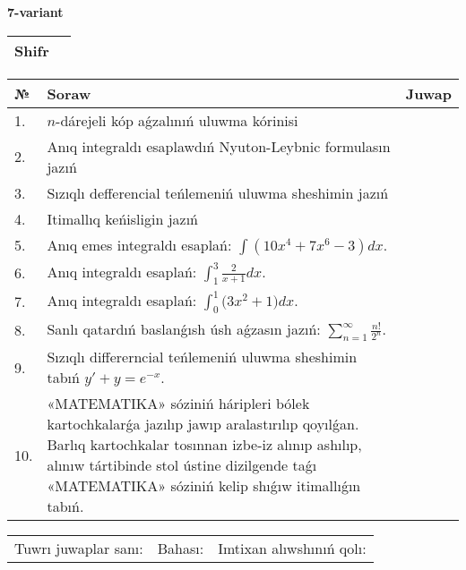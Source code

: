 \documentclass{article}
\begin{document}
  \egroup
  
  \newpage
  
  
  \textbf{7-variant}\\
  
  \bgroup
  \def\arraystretch{1.6} %
  
  \begin{tabular}{|m{5.7cm}|m{9.5cm}|}
  \hline
  Shifr & \\
  \hline
  \end{tabular}
  
  \vspace{1cm}
  
  \begin{tabular}{|m{0.7cm}|m{10cm}|m{4cm}|}
  \hline
  № & Soraw & Juwap \\
  \hline
  1. & \(n\)-dárejeli kóp aǵzalınıń uluwma kórinisi &  \\
  \hline
  2. & Anıq integraldı esaplawdıń Nyuton-Leybnic formulasın jazıń &  \\
  \hline
  3. & Sızıqlı defferencial teńlemeniń uluwma sheshimin jazıń &  \\
  \hline
  4. & Itimallıq keńisligin jazıń &  \\
  \hline
  5. & Anıq emes integraldı esaplań: \(\int{\left( 10x^{4} + 7x^{6} - 3 \right)dx}\). &  \\
  \hline
  6. & Anıq integraldı esaplań: \(\int_{1}^{3}\frac{2}{x + 1}dx\). &  \\
  \hline
  7. & Anıq integraldı esaplań: \(\int_{0}^{1}{(3x^2 } + 1)dx\). &  \\
  \hline
  8. & Sanlı qatardıń baslanǵısh úsh aǵzasın jazıń: \(\sum_{n = 1}^{\infty}\frac{n!}{2^{n}}\). &  \\
  \hline
  9. & Sızıqlı differerncial teńlemeniń uluwma sheshimin tabıń \(y' + y = e^{- x}\). &  \\
  \hline
  10. & «MATEMATIKA» sóziniń háripleri bólek kartochkalarǵa jazılıp jawıp aralastırılıp qoyılǵan. Barlıq kartochkalar tosınnan izbe-iz alınıp ashılıp, alınıw tártibinde stol ústine dizilgende taǵı «MATEMATIKA» sóziniń kelip shıǵıw itimallıǵın tabıń. &  \\
  \hline
  \end{tabular}
  
  \vspace{1cm}
  
  \begin{tabular}{lll}
  Tuwrı juwaplar sanı: \underline{\hspace{1.5cm}} & 
  Bahası: \underline{\hspace{1.5cm}} & 
  Imtixan alıwshınıń qolı: \underline{\hspace{2cm}} \\
  \end{tabular}
  
\end{document}
